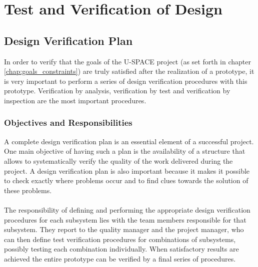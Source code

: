 \chapter{Test and Verification of Design}
\label{chap:test_verification}
%
\section{Design Verification Plan}
\label{sec:ver_plan}
%
In order to verify that the goals of the \ac{U-SPACE} project (as set forth in chapter \ref{chap:goals_constraints}) are truly satisfied after the realization of a prototype, it is very important to perform a series of design verification procedures with this prototype. Verification by analysis, verification by test and verification by inspection are the most important procedures.
%
\subsection{Objectives and Responsibilities}
%
A complete design verification plan is an essential element of a successful project. One main objective of having such a plan is the availability of a structure that allows to systematically verify the quality of the work delivered during the project. A design verification plan is also important because it makes it possible to check exactly where problems occur and to find clues towards the solution of these problems.
\\
\\
The responsibility of defining and performing the appropriate design verification procedures for each subsystem lies with the team members responsible for that subsystem. They report to the quality manager and the project manager, who can then define test verification procedures for combinations of subsystems, possibly testing each combination individually. When satisfactory results are achieved the entire prototype can be verified by a final series of procedures.
%

